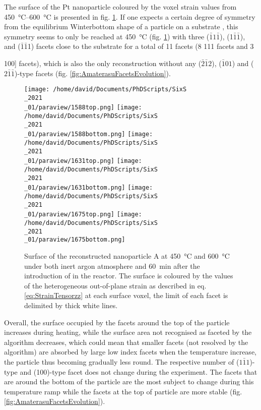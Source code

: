The surface of the Pt nanoparticle coloured by the voxel strain values from \qtyrange{450}{600}{\degreeCelsius} is presented in fig. \ref{fig:AmaterasuB}.
If one expects a certain degree of symmetry from the equilibrium Winterbottom shape of a particle on a substrate \parencite{Winterbottom1967, Boukouvala2021}, this symmetry seems to only be reached at \qty{450}{\degreeCelsius} (fig. \ref{fig:AmaterasuB}) with three ($\bar{1}1\bar{1}$), (1$\bar{1}\bar{1}$), and ($\bar{1}\bar{1}$1) facets close to the substrate for a total of 11 facets (8 {111} facets and 3 {100] facets), which is also the only reconstruction without any ($\bar{2}\bar{1}2$), ($\bar{1}01$) and ($2\bar{1}\bar{1}$)-type facets (fig. \ref{fig:AmaterasuFacetsEvolution}).

\begin{figure}[!htb]
    \centering
    \texttt{[image: /home/david/Documents/PhDScripts/SixS\\\_2021\\\_01/paraview/1588top.png]}
    \texttt{[image: /home/david/Documents/PhDScripts/SixS\\\_2021\\\_01/paraview/1588bottom.png]}
    \texttt{[image: /home/david/Documents/PhDScripts/SixS\\\_2021\\\_01/paraview/1631top.png]}
    \texttt{[image: /home/david/Documents/PhDScripts/SixS\\\_2021\\\_01/paraview/1631bottom.png]}
    \texttt{[image: /home/david/Documents/PhDScripts/SixS\\\_2021\\\_01/paraview/1675top.png]}
    \texttt{[image: /home/david/Documents/PhDScripts/SixS\\\_2021\\\_01/paraview/1675bottom.png]}
    \caption{
        Surface of the reconstructed nanoparticle A at \qty{450}{\degreeCelsius} and \qty{600}{\degreeCelsius} under both inert argon atmosphere and \qty{60}{\minute} after the introduction of \ammonia in the reactor.
        The surface is coloured by the values of the heterogeneous out-of-plane strain as described in eq. \ref{eq:StrainTensorzz} at each surface voxel, the limit of each facet is delimited by thick white lines.
    }
    \label{fig:AmaterasuB}
\end{figure}

Overall, the surface occupied by the facets around the top of the particle increases during heating, while the surface area not recognised as faceted by the algorithm decreases, which could mean that smaller facets (not resolved by the algorithm) are absorbed by large low index facets when the temperature increase, the particle thus becoming gradually less round.
The respective number of ($1\bar{1}1$)-type and (100)-type facet does not change during the experiment.
The facets that are around the bottom of the particle are the most subject to change during this temperature ramp while the facets at the top of particle are more stable (fig. \ref{fig:AmaterasuFacetsEvolution}).

}
